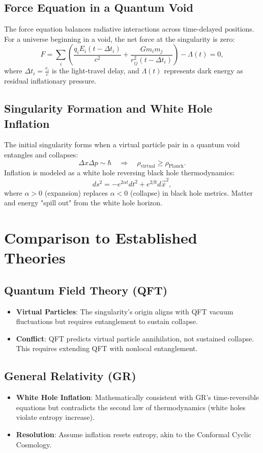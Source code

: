 \documentclass[12pt, a4paper]{article}
\begin{document}
\subsection{Force Equation in a Quantum Void}
The force equation balances radiative interactions across time-delayed positions. For a universe beginning in a void, the net force at the singularity is zero:
\[
F = \sum_i \left( \frac{q_i E_i(t - \Delta t_i)}{c^2} + \frac{G m_i m_j}{r_{ij}^2(t - \Delta t_i)} \right) - \Lambda(t) = 0,
\]
where \( \Delta t_i = \frac{r_i}{c} \) is the light-travel delay, and \( \Lambda(t) \) represents dark energy as residual inflationary pressure.

\subsection{Singularity Formation and White Hole Inflation}
The initial singularity forms when a virtual particle pair in a quantum void entangles and collapses:
\[
\Delta x \Delta p \sim \hbar \quad \Rightarrow \quad \rho_{\text{virtual}} \geq \rho_{\text{Planck}}.
\]
Inflation is modeled as a white hole reversing black hole thermodynamics:
\[
ds^2 = -e^{2\alpha t} dt^2 + e^{2\beta t} d\vec{x}^2,
\]
where \( \alpha > 0 \) (expansion) replaces \( \alpha < 0 \) (collapse) in black hole metrics. Matter and energy "spill out" from the white hole horizon.

\section{Comparison to Established Theories}
\subsection{Quantum Field Theory (QFT)}
\begin{itemize}
    \item \textbf{Virtual Particles}: The singularity's origin aligns with QFT vacuum fluctuations but requires entanglement to sustain collapse.
    \item \textbf{Conflict}: QFT predicts virtual particle annihilation, not sustained collapse. This requires extending QFT with nonlocal entanglement.
\end{itemize}

\subsection{General Relativity (GR)}
\begin{itemize}
    \item \textbf{White Hole Inflation}: Mathematically consistent with GR's time-reversible equations but contradicts the second law of thermodynamics (white holes violate entropy increase).
    \item \textbf{Resolution}: Assume inflation resets entropy, akin to the Conformal Cyclic Cosmology.
\end{itemize}
\end{document}
